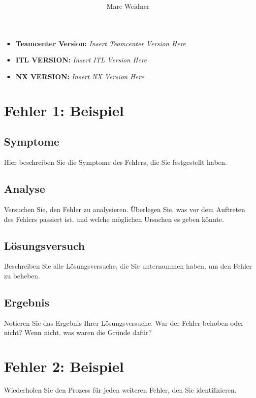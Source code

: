\documentclass{scrartcl}
\title{ \inc}
\author{Marc Weidner}
\newcommand{\teamcenterVersion}{\textbf{Teamcenter Version: }\textit{Insert Teamcenter Version Here}}
\newcommand{\itlVersion}{\textbf{ITL VERSION: }\textit{Insert ITL Version Here}}
\newcommand{\nxVersion}{\textbf{NX VERSION: }\textit{Insert NX Version Here}}
\begin{document}
	
	\maketitle
\vspace{15cm}
	\begin{itemize}
		\item \teamcenterVersion
		\item \itlVersion
		\item \nxVersion
	\end{itemize}

	\newpage
	\tableofcontents
	\newpage
	\section{Fehler 1: Beispiel}
	
	\subsection{Symptome}
	
	Hier beschreiben Sie die Symptome des Fehlers, die Sie festgestellt haben.
	
	\subsection{Analyse}
	
	Versuchen Sie, den Fehler zu analysieren. Überlegen Sie, was vor dem Auftreten des Fehlers passiert ist, und welche möglichen Ursachen es geben könnte.
	
	\subsection{Lösungsversuch}
	
	Beschreiben Sie alle Lösungsversuche, die Sie unternommen haben, um den Fehler zu beheben.
	
	\subsection{Ergebnis}
	
	Notieren Sie das Ergebnis Ihrer Lösungsversuche. War der Fehler behoben oder nicht? Wenn nicht, was waren die Gründe dafür?
	
	\section{Fehler 2: Beispiel}
	
	Wiederholen Sie den Prozess für jeden weiteren Fehler, den Sie identifizieren.
	
\end{document}

